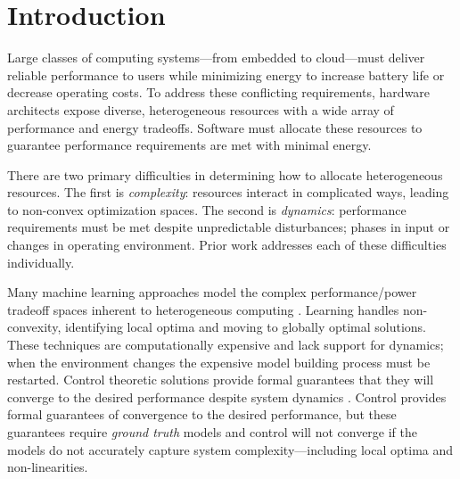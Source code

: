 \section{Introduction}
Large classes of computing systems---from embedded to cloud---must
deliver reliable performance to users while minimizing energy to
increase battery life or decrease operating costs.  To address these
conflicting requirements, hardware architects expose diverse,
heterogeneous resources with a wide array of performance and energy
tradeoffs.  Software must allocate these resources to
guarantee performance requirements are met with minimal energy.


There are two primary difficulties in determining how to allocate
heterogeneous resources.  The first is \emph{complexity}: resources
interact in complicated ways, leading to non-convex optimization
spaces.  The second is \emph{dynamics}: perfor\-mance requirements
must be met despite unpredictable disturbances; \eg{} phases in input
or changes in operating environment.  Prior work addresses each of
these difficulties individually.

Many machine learning approaches model the complex performance/power
tradeoff spaces inherent to heterogeneous computing
\cite{reddiHPCA2013,dubach2010,Bitirgen2008,Ipek,Koala,LEO,Flicker,Ponamarev,Paragon}.
Learning handles non-convexity, identifying local optima and moving to
globally optimal solutions. These techniques are computationally
expensive and lack support for dynamics; \ie{} when the environment
changes the expensive model building process must be restarted.
Control theoretic solutions provide formal guarantees that they will
converge to the desired performance despite system dynamics
\cite{Hellerstein2004a,Chen2011,POET,ControlWare,Agilos,grace2,JouleGuard}.
Control provides formal guarantees of convergence to the desired
performance, but these guarantees require \emph{ground truth} models
and control will not converge if the models do not accurately capture
system complexity---including local optima and non-linearities.



